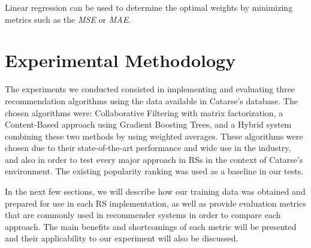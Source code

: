 \documentclass[cic,tc,english]{iiufrgs}
\begin{document}
Linear regression can be used to determine the optimal weights by minimizing metrics such as the \emph{MSE} or \emph{MAE}.


\chapter{Experimental Methodology} \label{experiment}

The experiments we conducted consisted in implementing and evaluating three recommendation algorithms using the data available in Catarse's database. The chosen algorithms were: Collaborative Filtering with matrix factorization, a Content-Based approach using Gradient Boosting Trees, and a Hybrid system combining these two methods by using weighted averages. These algorithms were chosen due to their state-of-the-art performance and wide use in the industry, and also in order to test every major approach in RSs in the context of Catarse's environment. The existing popularity ranking was used as a baseline in our tests.

In the next few sections, we will describe how our training data was obtained and prepared for use in each RS implementation, as well as provide evaluation metrics that are commonly used in recommender systems in order to compare each approach. The main benefits and shortcomings of each metric will be presented and their applicability to our experiment will also be discussed.
\end{document}
